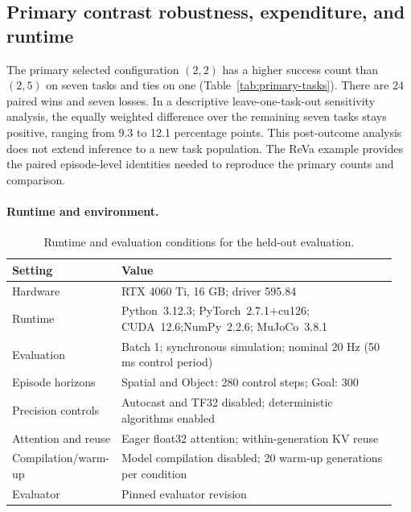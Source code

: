 \documentclass{article}
\begin{document}
\FloatBarrier
\subsection{Primary contrast robustness, expenditure, and runtime}
\label{app:primary-costs}

The primary selected configuration $(2,2)$ has a higher success count than
$(2,5)$ on seven tasks and ties on one (Table~\ref{tab:primary-tasks}).
There are 24 paired wins and seven
losses. In a descriptive leave-one-task-out sensitivity analysis, the
equally weighted difference over the remaining seven tasks stays positive,
ranging from 9.3 to 12.1 percentage points. This post-outcome analysis does not
extend inference to a new task population. The ReVa example provides the paired episode-level identities needed to
reproduce the primary counts and comparison.

\begin{table}[htbp]
\centering\small
\caption{Descriptive primary expenditure differences, selected minus comparator
at $h=2$, including all attempts. Intervals use the paired state bootstrap
conditional on the eight tasks and were added after outcomes were observed.
Timing intervals summarize sampling variation in the observed data; incomplete
process-monitoring coverage remains a limitation. Differences use unrounded
means and may differ from subtraction of the displayed values.}
\label{tab:primary-costs}

\end{table}

\paragraph{Runtime and environment.}
\begin{table}[H]
\centering\small
\caption{Runtime and evaluation conditions for the held-out evaluation.}
\label{tab:runtime}
\begin{tabular}{@{}>{\raggedright\arraybackslash}p{0.24\linewidth}>{\raggedright\arraybackslash}p{0.71\linewidth}@{}}
\toprule
Setting & Value\\
\midrule
Hardware & RTX 4060 Ti, 16 GB; driver 595.84\\
Runtime & Python~3.12.3; PyTorch~2.7.1+cu126; CUDA~12.6;\newline NumPy~2.2.6; MuJoCo~3.8.1\\
\addlinespace[3pt]
Evaluation & Batch 1; synchronous simulation; nominal 20 Hz (50 ms control period)\\
Episode horizons & Spatial and Object: 280 control steps; Goal: 300\\
\addlinespace[3pt]
Precision controls & Autocast and TF32 disabled; deterministic algorithms enabled\\
Attention and reuse & Eager float32 attention; within-generation KV reuse\\
Compilation/warm-up & Model compilation disabled; 20 warm-up generations per condition\\
\addlinespace[3pt]
Evaluator & Pinned evaluator revision\\
\bottomrule
\end{tabular}
\end{table}
\end{document}
